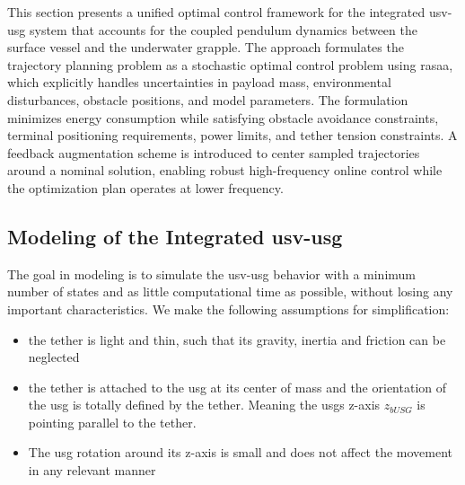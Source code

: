 \documentclass[a4paper,11pt]{article}
\begin{document}
This section presents a unified optimal control framework for the integrated \gls{usv}-\gls{usg} system that accounts for the coupled pendulum dynamics between the surface vessel and the underwater grapple. The approach formulates the trajectory planning problem as a stochastic optimal control problem using \gls{rasaa}, which explicitly handles uncertainties in payload mass, environmental disturbances, obstacle positions, and model parameters. The formulation minimizes energy consumption while satisfying   obstacle avoidance constraints, terminal positioning requirements, power limits, and tether tension constraints. A feedback augmentation scheme is introduced to center sampled trajectories around a nominal solution, enabling robust high-frequency online control while the optimization plan operates at lower frequency.  


\subsection{Modeling of the Integrated \gls{usv}-\gls{usg}}
\label{sec:Modeling}
The goal in modeling is to simulate the \gls{usv}-\gls{usg} behavior with a minimum number of states and as little computational time as possible, without losing any important characteristics. We make the following assumptions for simplification:

\begin{itemize}
	\item the tether is light and thin, such that its gravity, inertia and friction can be neglected
	\item the tether is attached to the \gls{usg} at its center of mass and the orientation of the \gls{usg} is totally defined by the tether. Meaning the \gls{usg}s z-axis $z_{bUSG}$ is pointing parallel to the tether. 
	\item The \gls{usg} rotation around its z-axis is small and does not affect the movement in any relevant manner
\end{itemize}
\end{document}
